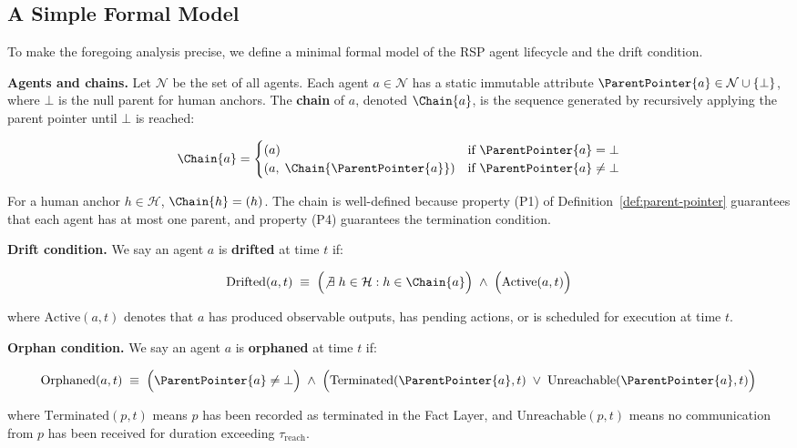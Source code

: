 \subsection{A Simple Formal Model}
\label{sec:drift-formal-model}

To make the foregoing analysis precise, we define a minimal formal model of the RSP agent lifecycle and the drift condition.

\bigskip
\noindent\textbf{Agents and chains.} Let $\mathcal{N}$ be the set of all agents. Each agent $a \in \mathcal{N}$ has a static immutable attribute $\ParentPointer{a} \in \mathcal{N} \cup \{\bot\}$, where $\bot$ is the null parent for human anchors. The \textbf{chain} of $a$, denoted $\Chain{a}$, is the sequence generated by recursively applying the parent pointer until $\bot$ is reached:

\[
\Chain{a} = 
\begin{cases}
(a) & \text{if } \ParentPointer{a} = \bot \\
(a, \; \Chain{\ParentPointer{a}}) & \text{if } \ParentPointer{a} \neq \bot
\end{cases}
\]

For a human anchor $h \in \mathcal{H}$, $\Chain{h} = (h)$. The chain is well-defined because property (P1) of Definition~\ref{def:parent-pointer} guarantees that each agent has at most one parent, and property (P4) guarantees the termination condition.

\bigskip
\noindent\textbf{Drift condition.} We say an agent $a$ is \textbf{drifted} at time $t$ if:

\[
\text{Drifted}(a, t) \;\equiv\; 
\Bigl( \not\exists\; h \in \mathcal{H} : h \in \Chain{a} \Bigr) 
\;\land\; 
\Bigl( \text{Active}(a, t) \Bigr)
\]

where $\text{Active}(a, t)$ denotes that $a$ has produced observable outputs, has pending actions, or is scheduled for execution at time $t$.

\bigskip
\noindent\textbf{Orphan condition.} We say an agent $a$ is \textbf{orphaned} at time $t$ if:

\[
\text{Orphaned}(a, t) \;\equiv\;
\Bigl( \ParentPointer{a} \neq \bot \Bigr)
\;\land\;
\Bigl( \text{Terminated}(\ParentPointer{a}, t) \;\lor\; \text{Unreachable}(\ParentPointer{a}, t) \Bigr)
\]

where $\text{Terminated}(p, t)$ means $p$ has been recorded as terminated in the Fact Layer, and $\text{Unreachable}(p, t)$ means no communication from $p$ has been received for duration exceeding $\tau_{\text{reach}}$.

